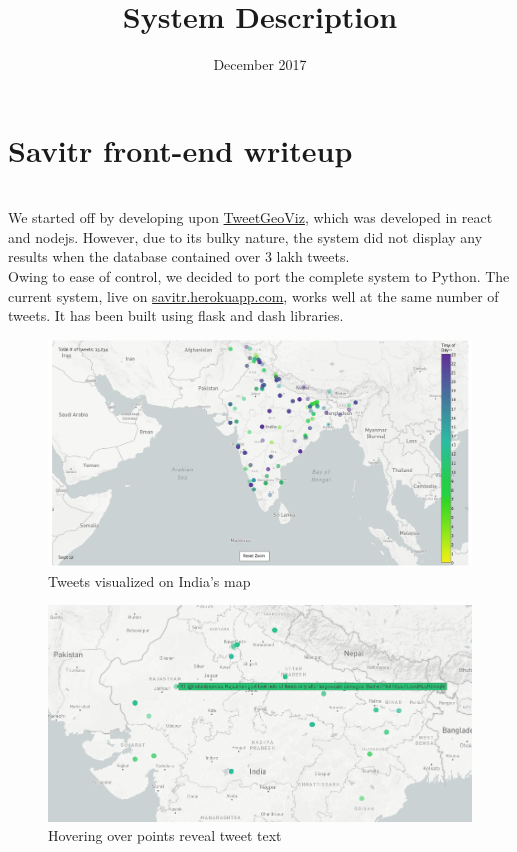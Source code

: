 \documentclass[journal, a4paper]{IEEEtran}
\title{System Description}
\date{December 2017}
\begin{document}
\maketitle

\section{Savitr front-end writeup}

\href{https://github.com/JaredHawkins/TweetGeoViz}\\

We started off by developing upon \href{https://github.com/JaredHawkins/TweetGeoViz}{TweetGeoViz}, which was developed in react and nodejs. 
However, due to its bulky nature, the system did not display any results when the database contained over 3 lakh tweets.\\

Owing to ease of control, we decided to port the complete system to Python. The current system, live on \href{http://savitr.herokuapp.com}{savitr.herokuapp.com}, works well at the same number of tweets. It has been built using flask and dash libraries.

\begin{figure}[h!]
\centering
\includegraphics[width=\columnwidth]{map_general.png}
\caption{ Tweets visualized on India’s map}
\label{fig:map_general}
\end{figure}


\begin{figure}[h!]
\centering
\includegraphics[width=\columnwidth]{map_hovertext.png}
\caption{Hovering over points reveal tweet text}
\label{fig:map_hovertext}
\end{figure}
\end{document}
